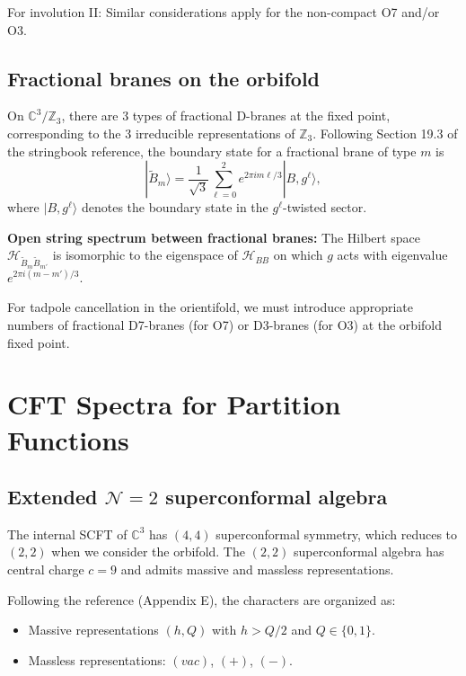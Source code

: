 \documentclass[11pt]{article}
\newcommand{\Z}{\mathbb{Z}}
\newcommand{\C}{\mathbb{C}}
\newcommand{\NN}{\mathcal{N}}
\begin{document}
For involution II: Similar considerations apply for the non-compact O7 and/or O3.

\subsection{Fractional branes on the orbifold}

On $\C^3/\Z_3$, there are 3 types of fractional D-branes at the fixed point, corresponding to the 3 irreducible representations of $\Z_3$. Following Section 19.3 of the stringbook reference, the boundary state for a fractional brane of type $m$ is
\begin{equation}
|\tilde{B}_m\rangle = \frac{1}{\sqrt{3}} \sum_{\ell=0}^{2} e^{2\pi i m\ell/3} |B, g^\ell\rangle,
\end{equation}
where $|B, g^\ell\rangle$ denotes the boundary state in the $g^\ell$-twisted sector.

\textbf{Open string spectrum between fractional branes:} The Hilbert space $\mathcal{H}_{\tilde{B}_m \tilde{B}_{m'}}$ is isomorphic to the eigenspace of $\mathcal{H}_{BB}$ on which $g$ acts with eigenvalue $e^{2\pi i(m-m')/3}$.

For tadpole cancellation in the orientifold, we must introduce appropriate numbers of fractional D7-branes (for O7) or D3-branes (for O3) at the orbifold fixed point.

\section{CFT Spectra for Partition Functions}

\subsection{Extended $\NN=2$ superconformal algebra}

The internal SCFT of $\C^3$ has $(4,4)$ superconformal symmetry, which reduces to $(2,2)$ when we consider the orbifold. The $(2,2)$ superconformal algebra has central charge $c = 9$ and admits massive and massless representations.

Following the reference (Appendix E), the characters are organized as:
\begin{itemize}
\item Massive representations $(h, Q)$ with $h > Q/2$ and $Q \in \{0, 1\}$.
\item Massless representations: $(vac)$, $(+)$, $(-)$.
\end{itemize}
\end{document}
